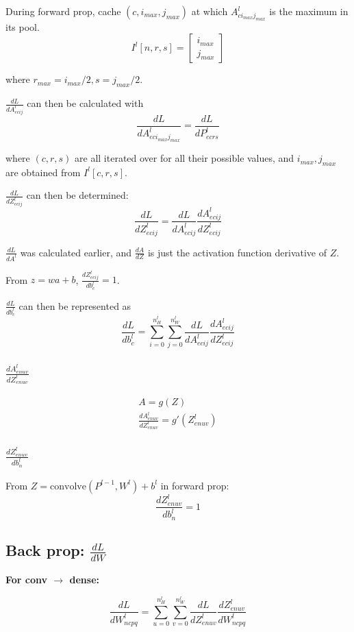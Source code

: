 \documentclass[12pt]{article}
\begin{document}
During forward prop, cache $(c, i_{max}, j_{max})$ at which $A^l_{ci_{max}j_{max}}$ is the maximum
in its pool.
\[ I^l[n,r,s] = \begin{bmatrix}i_{max}\\j_{max}\end{bmatrix} \]

where $r_{max} = i_{max}/2, s = j_{max}/2$.

$\frac{dL}{dA^{l}_{ecij}}$ can then be calculated with
\[ \frac{dL}{dA^l_{eci_{max}j_{max}}} = \frac{dL}{dP^l_{ecrs}} \]

where $(c,r,s)$ are all iterated over for all their possible values, and $i_{max}, j_{max}$
are obtained from $I^l[c,r,s]$.

$\frac{dL}{dZ^l_{ecij}}$ can then be determined:
\[ \frac{dL}{dZ^l_{ecij}} = \frac{dL}{dA^l_{ecij}} \frac{dA^l_{ecij}}{dZ^l_{ecij}} \]

$\frac{dL}{dA^l}$ was calculated earlier, and $\frac{dA}{dZ}$ is just the activation function derivative of $Z$.

From $z = wa + b$, $\frac{dZ^l_{ecij}}{db^l_c} = 1$.

$\frac{dL}{db^l_c}$ can then be represented as
\[ \frac{dL}{db^l_c} = \sum_{i=0}^{n_H^l} \sum_{j=0}^{n_W^l} \frac{dL}{dA^l_{ecij}} \frac{dA^l_{ecij}}{dZ^l_{ecij}} \]

\subsubsection{$\frac{dA^l_{enuv}}{dZ^l_{enuv}}$}

\begin{gather*}
    A = g(Z)\\
    \frac{dA^l_{enuv}}{dZ^l_{enuv}} = g'(Z^l_{enuv})
\end{gather*}

\subsubsection{$\frac{dZ^l_{enuv}}{db^l_n}$}

From $Z = \text{convolve}(P^{l-1},W^l) + b^l$ in forward prop:
\[ \frac{dZ^l_{enuv}}{db^l_n} = 1 \]

\subsection{Back prop: $\frac{dL}{dW}$}

\textbf{For conv $\rightarrow$ dense:}

\[ \frac{dL}{dW^l_{ncpq}} = \sum_{u=0}^{n_H^l} \sum_{v=0}^{n_W^l} \frac{dL}{dZ^l_{enuv}}
\frac{dZ^l_{enuv}}{dW^l_{ncpq}} \]
\end{document}
